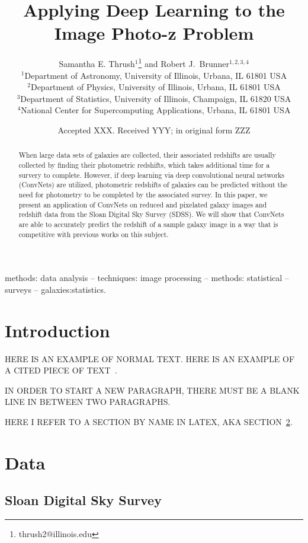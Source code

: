 \documentclass[fleqn,usenatbib]{mnras}
\title[Dreaming of Photo-z's]{Applying Deep Learning to the Image Photo-z Problem}
\author[S. E. Thrush and R. J. Brunner]{
  Samantha E. Thrush$^1$\thanks{thrush2@illinois.edu} and Robert J.~Brunner$^{1,2,3,4}$ \\
$^1$Department of Astronomy, University of Illinois, Urbana, IL 61801 USA\\
$^2$Department of Physics, University of Illinois, Urbana, IL 61801 USA\\
$^3$Department of Statistics, University of Illinois, Champaign, IL 61820 USA\\
$^4$National Center for Supercomputing Applications, Urbana, IL 61801 USA
}
\date{Accepted XXX. Received YYY; in original form ZZZ}
\begin{document}
\label{firstpage}
\pagerange{\pageref{firstpage}--\pageref{lastpage}}
\maketitle

\begin{abstract}
When large data sets of galaxies are collected, their associated redshifts are usually collected by finding their photometric redshifts, which takes additional time for a survery to complete.  However, if deep learning via deep convolutional neural networks (ConvNets) are utilized, photometric redshifts of galaxies can be predicted without the need for photometry to be completed by the associated survey. In this paper, we present an application of ConvNets on reduced and pixelated galaxy images and redshift data from the Sloan Digital Sky Survey (SDSS).  We will show that ConvNets are able to accurately predict the redshift of a sample galaxy image in a way that is competitive with previous works on this subject.
\end{abstract}

\begin{keywords}
methods: data analysis -- techniques: image processing -- methods: statistical
-- surveys -- galaxies:statistics.
\end{keywords}

\section{Introduction}
  \label{sec:introduction}

HERE IS AN EXAMPLE OF NORMAL TEXT. HERE IS AN EXAMPLE OF A CITED PIECE OF TEXT~\citep{ross2011ameliorating,seo2012acoustic}.

IN ORDER TO START A NEW PARAGRAPH, THERE MUST BE A BLANK LINE IN BETWEEN TWO PARAGRAPHS.

HERE I REFER TO A SECTION BY NAME IN LATEX, AKA SECTION~\ref{sec:data}.

\section{Data}
  \label{sec:data}

\subsection{Sloan Digital Sky Survey}
  \label{sec:sdss}
\end{document}
